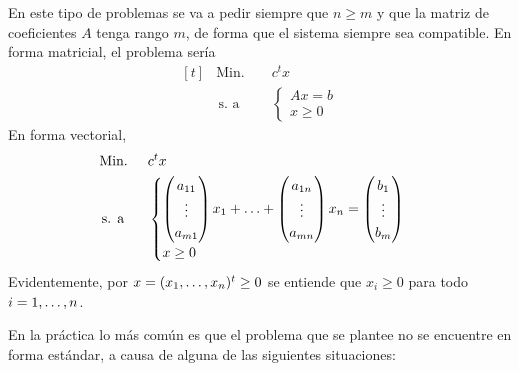 \documentclass[11pt]{report}
\theoremstyle{mytheorem}
\theoremstyle{mydefinition}
\theoremstyle{myexample}
\begin{document}
En este tipo de problemas se va a pedir siempre que $n \geq m$ y que la matriz de coeficientes $A$ tenga rango $m$, de forma que el sistema siempre sea compatible. En forma matricial, el problema sería
\[\begin{aligned}[t]
&\text{Min. } && c^tx \\
& \, \text{s. a} &&\begin{cases}
    Ax = b \\
    x \geq 0
\end{cases}
\end{aligned}\]
En forma vectorial,
\[\begin{aligned}[t]
&\text{Min. } && c^tx \\
& \, \text{s. a} &&\begin{cases}
    \begin{pmatrix}
        a_{11} \\
        \vdots \\
        a_{m1}
    \end{pmatrix} x_1 + \mathellipsis + \begin{pmatrix}
        a_{1n} \\
        \vdots \\
        a_{mn}
    \end{pmatrix} x_n = \begin{pmatrix}
        b_1 \\
        \vdots \\
        b_m
    \end{pmatrix} \\
    x \geq 0
\end{cases}
\end{aligned}\]
Evidentemente, por $x = (x_1,\mathellipsis,x_n)^t \geq 0$ se entiende que $x_i \geq 0$ para todo $i = 1,\mathellipsis,n$.



En la práctica lo más común es que el problema que se plantee no se encuentre en forma estándar, a causa de alguna de las siguientes situaciones:
\end{document}
